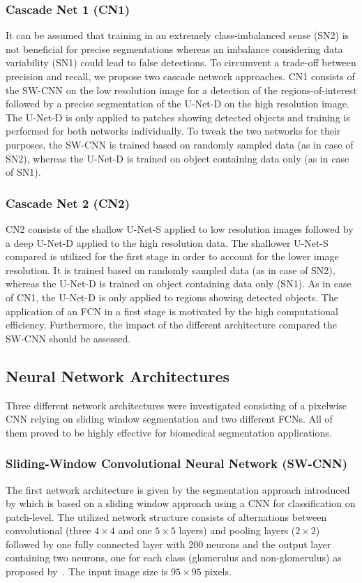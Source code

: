 \documentclass{elsarticle}
\begin{document}
\subsubsection{Cascade Net 1 (CN1)}
	It can be assumed that training in an extremely class-imbalanced sense (SN2) is not beneficial for precise segmentations whereas an imbalance considering data variability (SN1) could lead to false detections.
	To circumvent a trade-off between precision and recall, we propose two cascade network approaches. CN1 consists of the SW-CNN on the low resolution image for a detection of the regions-of-interest followed by a precise segmentation of the U-Net-D on the high resolution image.
	The U-Net-D is only applied to patches showing detected objects and training is performed for both networks individually.
	To tweak the two networks for their purposes, the SW-CNN is trained based on randomly sampled data (as in case of SN2), whereas the U-Net-D is trained on object containing data only (as in case of SN1).
\subsubsection{Cascade Net 2 (CN2)}
	CN2 consists of the shallow U-Net-S applied to low resolution images followed by a deep U-Net-D applied to the high resolution data.
	The shallower U-Net-S compared is utilized for the first stage in order to account for the lower image resolution.
	It is trained based on randomly sampled data (as in case of SN2), whereas the U-Net-D is trained on object containing data only (SN1).
	As in case of CN1, the U-Net-D is only applied to regions showing detected objects.
	The application of an FCN in a first stage is motivated by the high computational efficiency. 
	Furthermore, the impact of the different architecture compared the SW-CNN should be assessed.





\subsection{Neural Network Architectures}
Three different network architectures were investigated consisting of a pixelwise CNN relying on sliding window segmentation and two different FCNs. 
All of them proved to be highly effective for biomedical segmentation applications.

\subsubsection{Sliding-Window Convolutional Neural Network (SW-CNN)}\label{sec_pixelwiseCNN}
The first network architecture is given by the segmentation approach introduced by \cite{NIPS2012_4741} which is based on a sliding window approach using a CNN for classification on patch-level.
The utilized network structure consists of alternations between convolutional (three $4\times4$ and one $5\times5$ layers) and pooling layers ($2\times2$) followed by one fully connected layer with 200 neurons and the output layer containing two neurons, one for each class (glomerulus and non-glomerulus) as proposed by~\cite{NIPS2012_4741}. The input image size is $95\times95$ pixels.
\end{document}

